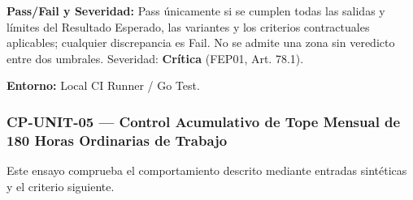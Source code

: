 \par\noindent\textbf{Pass/Fail y Severidad:} Pass únicamente si se cumplen todas las salidas y límites del Resultado Esperado, las variantes y los criterios contractuales aplicables; cualquier discrepancia es Fail. No se admite una zona sin veredicto entre dos umbrales. Severidad: \textbf{Crítica} (FEP01, Art. 78.1).\par
\par\noindent\textbf{Entorno:} Local CI Runner / Go Test.\par






\subsubsection*{CP-UNIT-05 — Control Acumulativo de Tope Mensual de 180 Horas Ordinarias de Trabajo}\label{sec:9-cp-unit-05}
Este ensayo comprueba el comportamiento descrito mediante entradas sintéticas y el criterio siguiente.

